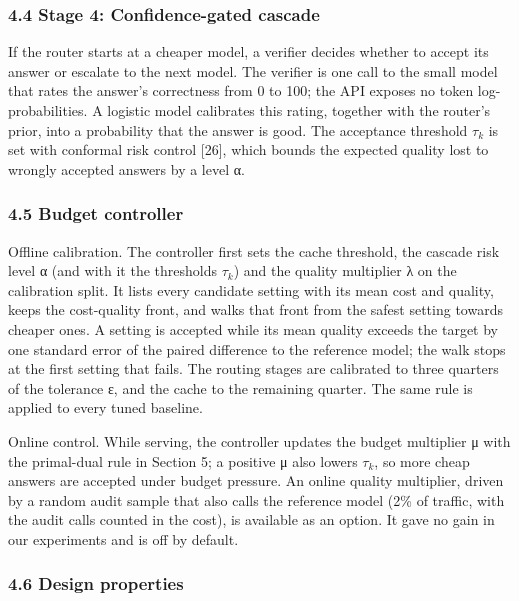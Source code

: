 \documentclass[
  10pt,
]{article}
\begin{document}
\subsubsection{4.4 Stage 4: Confidence-gated
cascade}\label{stage-4-confidence-gated-cascade}

If the router starts at a cheaper model, a verifier decides whether to
accept its answer or escalate to the next model. The verifier is one
call to the small model that rates the answer's correctness from 0 to
100; the API exposes no token log-probabilities. A logistic model
calibrates this rating, together with the router's prior, into a
probability that the answer is good. The acceptance threshold \(\tau_k\)
is set with conformal risk control {[}26{]}, which bounds the expected
quality lost to wrongly accepted answers by a level α.

\subsubsection{4.5 Budget controller}\label{budget-controller}

Offline calibration. The controller first sets the cache threshold, the
cascade risk level α (and with it the thresholds \(\tau_k\)) and the
quality multiplier λ on the calibration split. It lists every candidate
setting with its mean cost and quality, keeps the cost-quality front,
and walks that front from the safest setting towards cheaper ones. A
setting is accepted while its mean quality exceeds the target by one
standard error of the paired difference to the reference model; the walk
stops at the first setting that fails. The routing stages are calibrated
to three quarters of the tolerance ε, and the cache to the remaining
quarter. The same rule is applied to every tuned baseline.

Online control. While serving, the controller updates the budget
multiplier μ with the primal-dual rule in Section 5; a positive μ also
lowers \(\tau_k\), so more cheap answers are accepted under budget
pressure. An online quality multiplier, driven by a random audit sample
that also calls the reference model (2\% of traffic, with the audit
calls counted in the cost), is available as an option. It gave no gain
in our experiments and is off by default.

\subsubsection{4.6 Design properties}\label{design-properties}
\end{document}
